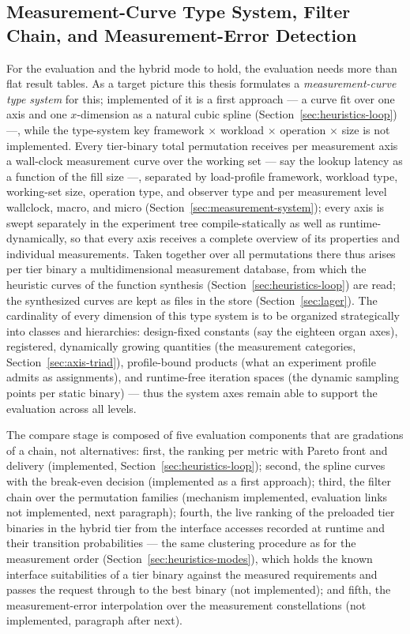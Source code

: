 \begin{nurlang}
\subsection{Measurement-Curve Type System, Filter Chain, and Measurement-Error Detection}\label{sec:heuristics-curves}
For the evaluation and the hybrid mode to hold, the evaluation needs more than flat
result tables. As a target picture this thesis formulates a \emph{measurement-curve type system} for this; implemented of
it is a first approach --- a curve fit over one axis and one $x$-dimension as a natural cubic
spline (Section~\ref{sec:heuristics-loop}) ---, while the type-system key framework $\times$
workload $\times$ operation $\times$ size is not implemented. Every tier-binary total permutation receives
per measurement axis a wall-clock measurement curve over the working set --- say the lookup latency as a function of the
fill size ---, separated by load-profile framework, workload type, working-set size,
operation type, and observer type and per measurement level wallclock, macro, and micro
(Section~\ref{sec:measurement-system}); every axis is swept separately in the experiment tree compile-statically as well as
runtime-dynamically, so that every axis receives a complete overview of its
properties and individual measurements. Taken together over all permutations there thus arises per
tier binary a multidimensional measurement database, from which the heuristic curves of the function synthesis
(Section~\ref{sec:heuristics-loop}) are read; the synthesized curves are kept as files in the
store (Section~\ref{sec:lager}). The cardinality of every dimension of this
type system is to be organized strategically into classes and hierarchies: design-fixed constants (say the
eighteen organ axes), registered, dynamically growing quantities (the measurement categories,
Section~\ref{sec:axis-triad}), profile-bound products (what an experiment profile admits as assignments),
and runtime-free iteration spaces (the dynamic sampling points per static binary) --- thus
the system axes remain able to support the evaluation across all levels.

The compare stage is composed of five evaluation components that are gradations of a chain,
not alternatives: first, the ranking per metric with Pareto front and delivery (implemented,
Section~\ref{sec:heuristics-loop}); second, the spline curves with the break-even decision (implemented as a
first approach); third, the filter chain over the permutation families (mechanism implemented,
evaluation links not implemented, next paragraph); fourth, the live ranking of the preloaded tier binaries in the
hybrid tier from the interface accesses recorded at runtime and their
transition probabilities --- the same clustering procedure as for the measurement order
(Section~\ref{sec:heuristics-modes}), which holds the known interface suitabilities of a tier binary against the
measured requirements and passes the request through to the best binary (not implemented); and
fifth, the measurement-error interpolation over the measurement constellations (not implemented, paragraph after next).


\end{nurlang}
